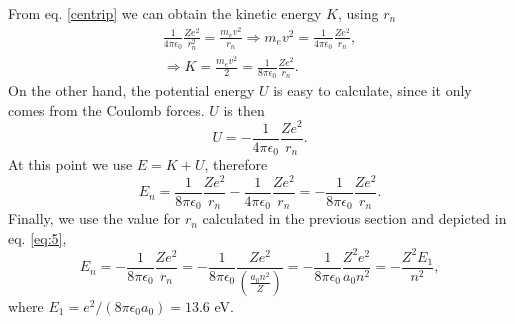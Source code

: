 \begin{questions}
\begin{solution}
  From eq. \ref{centrip} we can obtain the kinetic energy $K$, using $r_n$
  \begin{eqnarray}
\frac{1}{4\pi\epsilon_0}\frac{Ze^2}{r_n^2} = \frac{m_ev^2}{r_n}
\Rightarrow m_ev^2 = \frac{1}{4\pi\epsilon_0}\frac{Ze^2}{r_n},\nonumber\\
\Rightarrow K = \frac{m_ev^2}{2} = \frac{1}{8\pi\epsilon_0}\frac{Ze^2}{r_n}.
\end{eqnarray}
On the other hand, the potential energy $U$ is easy to calculate, since it only comes from the Coulomb forces. $U$ is then
\begin{equation}
  U = - \frac{1}{4\pi\epsilon_0}\frac{Ze^2}{r_n}.
\end{equation}
At this point we use $E = K + U$, therefore
\begin{equation}
  E_n = \frac{1}{8\pi\epsilon_0}\frac{Ze^2}{r_n} - \frac{1}{4\pi\epsilon_0}\frac{Ze^2}{r_n} = - \frac{1}{8\pi\epsilon_0}\frac{Ze^2}{r_n}.
\end{equation}
Finally, we use the value for $r_n$ calculated in the previous section and depicted in eq. \ref{eq:5},
\begin{equation}
  E_n = - \frac{1}{8\pi\epsilon_0}\frac{Ze^2}{r_n}
   = - \frac{1}{8\pi\epsilon_0}\frac{Ze^2}{\left(\frac{a_0n^2}{Z}\right)}
   = - \frac{1}{8\pi\epsilon_0}\frac{Z^2e^2}{a_0n^2} = -\frac{Z^2 E_1}{n^2},
\end{equation}
where $E_1 = e^2/(8\pi\epsilon_0a_0) = 13.6$ eV.
\end{solution}
\end{questions}
